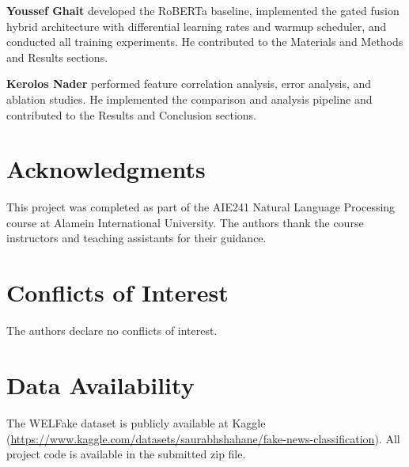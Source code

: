 \documentclass[10pt,twoside]{article}
\begin{document}
\textbf{Youssef Ghait} developed the RoBERTa baseline,
implemented the gated fusion hybrid architecture with
differential learning rates and warmup scheduler, and
conducted all training experiments.
He contributed to the Materials and Methods and Results
sections.

\textbf{Kerolos Nader} performed feature correlation
analysis, error analysis, and ablation studies.
He implemented the comparison and analysis pipeline and
contributed to the Results and Conclusion sections.

\section*{Acknowledgments}

This project was completed as part of the AIE241 Natural
Language Processing course at Alamein International
University. The authors thank the course instructors and
teaching assistants for their guidance.

\section*{Conflicts of Interest}

The authors declare no conflicts of interest.

\section*{Data Availability}

The WELFake dataset is publicly available at Kaggle
(\url{https://www.kaggle.com/datasets/saurabhshahane/fake-news-classification}).
All project code is available in the submitted zip file.
\end{document}
